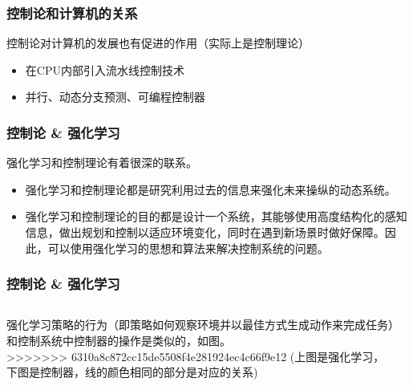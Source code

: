 \documentclass[12pt,AutoFakeBold,aspectratio=43,mathserif]{beamer}
\begin{document}
\begin{frame}
\begin{columns}
\begin{column}{.4\linewidth}
\begin{frame}
    \end{frame}
    \begin{frame}
        \frametitle{控制论和计算机的关系}
        控制论对计算机的发展也有促进的作用（实际上是控制理论） \pause
        \begin{itemize}
            \item 在CPU内部引入流水线控制技术

            \item 并行、动态分支预测、可编程控制器
        \end{itemize}
        
    \end{frame}
    \begin{frame}
        \frametitle{控制论 \& 强化学习}
        强化学习和控制理论有着很深的联系。 \pause
        \begin{itemize}
            \item  强化学习和控制理论都是研究利用过去的信息来强化未来操纵的动态系统。\pause
            \item  强化学习和控制理论的目的都是设计一个系统，其能够使用高度结构化的感知信息，做出规划和控制以适应环境变化，同时在遇到新场景时做好保障。因此，可以使用强化学习的思想和算法来解决控制系统的问题。 
        \end{itemize}
    \end{frame}
    \begin{frame}
        \frametitle{控制论 \& 强化学习}
        \begin{columns}
            \begin{column}{.4\linewidth}
                强化学习策略的行为（即策略如何观察环境并以最佳方式生成动作来完成任务）和控制系统中控制器的操作是类似的，如图。 \\
>>>>>>> 6310a8c872cc15de5508f4e281924ec4c66f9e12
                (上图是强化学习，下图是控制器，线的颜色相同的部分是对应的关系)
            \end{column}
            \begin{column}{.5\linewidth}

\end{column}
\end{columns}
\end{frame}
\end{column}
\end{columns}
\end{frame}
\end{document}
